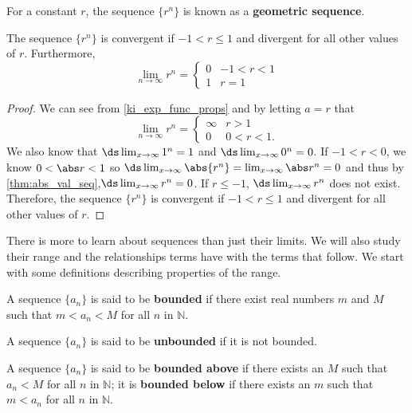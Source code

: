 
\begin{definition}\label{def:geom_seq}
For a constant $r$, the sequence $\{r^n\}$ is known as a \textbf{geometric sequence}.
\end{definition}

\begin{theorem}\label{thm:geom_seq}
The sequence $\{r^n\}$ is convergent if $-1<r\leq 1$ and divergent for all other values of $r$.  Furthermore,
\[
\lim_{n\to \infty} r^n=\begin{cases} 
0&  -1<r<1\\
1& r=1
\end{cases}\]
\end{theorem}

\begin{proof}
We can see from \autoref{ki_exp_func_props} and by letting $a=r$ that
\[
\lim_{n\to \infty} r^n =
\begin{cases}
\infty &  r>1\\
0 & 0<r<1.
\end{cases}
\]
We also know that $\ds  \lim_{x\to \infty} 1^n=1$ and $\ds  \lim_{x\to \infty} 0^n=0$. If $-1<r<0$, we know $0<\abs r<1$ so $\ds \lim_{x\to \infty}\abs{r^n}=\lim_{x\to \infty}\abs r^n=0$ and thus by \autoref{thm:abs_val_seq},$\ds \lim_{x\to \infty} r^n=0$. If $r\le-1$, $\ds \lim_{x\to \infty} r^n$ does not exist. Therefore, the sequence $\{ r^n\}$ is convergent if $-1<r\leq 1$ and divergent for all other values of $r$.
\end{proof}



There is more to learn about sequences than just their limits. We will also study their range and the relationships terms have with the terms that follow. We start with some definitions describing properties of the range.

\begin{definition}\label{def:bounded}
A sequence $\{a_n\}$ is said to be \textbf{bounded} if there exist real numbers $m$ and $M$ such that $m < a_n < M$ for all $n$ in $\mathbb{N}$.\bigskip

A sequence $\{a_n\}$ is said to be \textbf{unbounded} if it is not bounded.\bigskip

A sequence $\{a_n\}$ is said to be \textbf{bounded above} if there exists an $M$ such that $a_n < M$ for all $n$ in $\mathbb{N}$; it is \textbf{bounded below} if there exists an $m$ such that $m<a_n$ for all $n$ in $\mathbb{N}$.
\end{definition}

